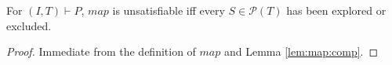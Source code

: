 
\begin{corollary}
\label{cor:map:cc}
For $(I, T) \vdash P$, $map$ is unsatisfiable iff every $S \in
\mathcal{P}(T)$ has been explored or excluded.
\end{corollary}
\begin{proof}
Immediate from the definition of $map$ and Lemma \ref{lem:map:comp}.
\end{proof}


